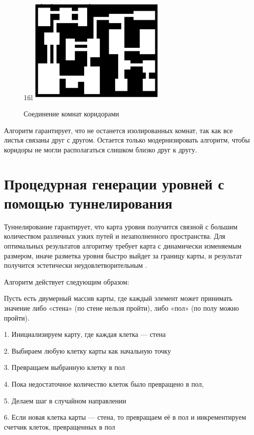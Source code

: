 \documentclass[a4paper,12pt]{report}
\makeatletter
\newcommand*{\centerfloat}{%
  \parindent \z@
  \leftskip \z@ \@plus 1fil \@minus \textwidth
  \rightskip\leftskip
  \parfillskip \z@skip}
\makeatother
\begin{document}
\begin{figure}
    \centerfloat
    \includegraphics[width=0.6\textwidth]{levels/4.png}
    \caption{Соединение комнат коридорами \citep{bsp}}
    \label{fig:bsp3}
\end{figure}

Алгоритм гарантирует, что не останется изолированных комнат, так как все листья связаны друг с другом. Остается только модернизировать алгоритм, чтобы коридоры не могли располагаться слишком близко друг к другу.

\section{Процедурная генерации уровней с помощью туннелирования}

Туннелирование гарантирует, что карта уровня получится связной с большим количеством различных узких путей и незаполненного пространства. Для оптимальных результатов алгоритму требует карта с динамически изменяемым размером, иначе разметка уровня быстро выйдет за границу карты, и результат получится эстетически неудовлетворительным \citep{tunnel}.

Алгоритм действует следующим образом:

Пусть есть двумерный массив карты, где каждый элемент может принимать значение либо «стена» (по стене нельзя пройти), либо «пол» (по полу можно пройти).

1. Инициализируем карту, где каждая клетка — стена

2. Выбираем любую клетку карты как начальную точку

3. Превращаем выбранную клетку в пол

4. Пока недостаточное количество клеток было превращено в пол,

5. Делаем шаг в случайном направлении

6. Если новая клетка карты — стена, то превращаем её в пол и инкрементируем счетчик клеток, превращенных в пол
\end{document}
